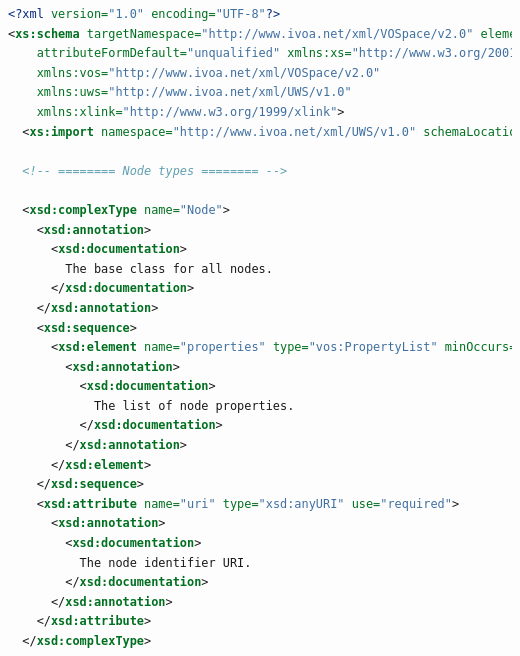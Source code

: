\documentclass[11pt,a4paper]{ivoa}
\begin{document}
\begin{lstlisting}[language=xml, basicstyle=\scriptsize]
<?xml version="1.0" encoding="UTF-8"?>
<xs:schema targetNamespace="http://www.ivoa.net/xml/VOSpace/v2.0" elementFormDefault="qualified"
    attributeFormDefault="unqualified" xmlns:xs="http://www.w3.org/2001/XMLSchema"
    xmlns:vos="http://www.ivoa.net/xml/VOSpace/v2.0"
    xmlns:uws="http://www.ivoa.net/xml/UWS/v1.0"
    xmlns:xlink="http://www.w3.org/1999/xlink">
  <xs:import namespace="http://www.ivoa.net/xml/UWS/v1.0" schemaLocation="http://www.ivoa.net/xml/UWS/v1.0"/>

  <!-- ======== Node types ======== -->

  <xsd:complexType name="Node">
    <xsd:annotation>
      <xsd:documentation>
        The base class for all nodes.
      </xsd:documentation>
    </xsd:annotation>
    <xsd:sequence>
      <xsd:element name="properties" type="vos:PropertyList" minOccurs="0" maxOccurs="1">
        <xsd:annotation>
          <xsd:documentation>
            The list of node properties.
          </xsd:documentation>
        </xsd:annotation>
      </xsd:element>            
    </xsd:sequence>
    <xsd:attribute name="uri" type="xsd:anyURI" use="required">
      <xsd:annotation>
        <xsd:documentation>
          The node identifier URI.
        </xsd:documentation>
      </xsd:annotation>
    </xsd:attribute>
  </xsd:complexType>


\end{lstlisting}
\end{document}

